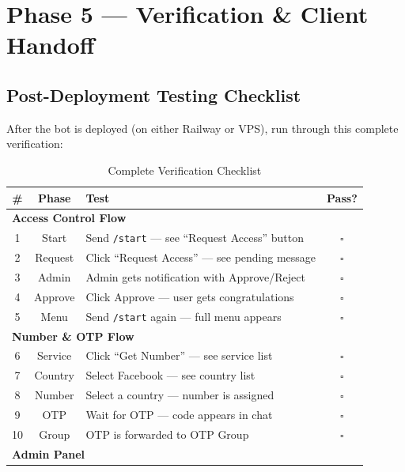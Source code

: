
\chapter{Phase 5 --- Verification \& Client Handoff}

\section{Post-Deployment Testing Checklist}

After the bot is deployed (on either Railway or VPS), run through this complete verification:

\begin{table}[H]
\centering
\caption{Complete Verification Checklist}
\begin{tabularx}{\textwidth}{|c|c|X|c|}
\hline
\textbf{\#} & \textbf{Phase} & \textbf{Test} & \textbf{Pass?} \\
\hline
\multicolumn{4}{|l|}{\cellcolor{brandLight}\textbf{Access Control Flow}} \\
\hline
1 & Start & Send \texttt{/start} --- see ``Request Access'' button & $\square$ \\
\hline
2 & Request & Click ``Request Access'' --- see pending message & $\square$ \\
\hline
3 & Admin & Admin gets notification with Approve/Reject & $\square$ \\
\hline
4 & Approve & Click Approve --- user gets congratulations & $\square$ \\
\hline
5 & Menu & Send \texttt{/start} again --- full menu appears & $\square$ \\
\hline
\multicolumn{4}{|l|}{\cellcolor{brandLight}\textbf{Number \& OTP Flow}} \\
\hline
6 & Service & Click ``Get Number'' --- see service list & $\square$ \\
\hline
7 & Country & Select Facebook --- see country list & $\square$ \\
\hline
8 & Number & Select a country --- number is assigned & $\square$ \\
\hline
9 & OTP & Wait for OTP --- code appears in chat & $\square$ \\
\hline
10 & Group & OTP is forwarded to OTP Group & $\square$ \\
\hline
\multicolumn{4}{|l|}{\cellcolor{brandLight}\textbf{Admin Panel}} \\

\end{tabularx}
\end{table}

